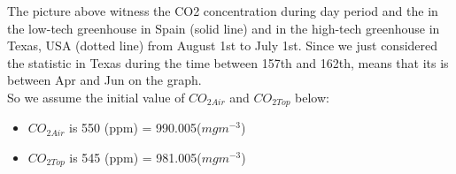 \documentclass[a4paper]{article}
\numberwithin{equation}{section}
\begin{document}
The picture above witness the CO2 concentration during day period and the in the low-tech greenhouse in Spain (solid line) and in the high-tech
greenhouse in Texas, USA (dotted line) from August 1st to July 1st. Since we just considered the statistic in Texas during the time between 157th and 162th, means that its is between Apr and Jun on the graph.\\

So we assume the initial value of $CO_{2Air}$ and $CO_{2Top}$ below:

\begin{itemize}
    \item $CO_{2Air}$ is 550 (ppm) = 990.005($mgm^{-3}$)
    \item $CO_{2Top}$ is 545 (ppm) = 981.005($mgm^{-3}$)
\end{itemize}
\end{document}
